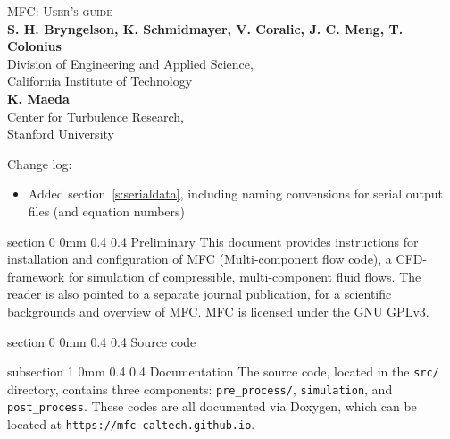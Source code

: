 \documentclass[11pt]{article}
\makeatletter
\renewcommand{\section}{\@startsection
{section}%
{0}%
{0mm}%
{0.4\baselineskip}%
{0.4\baselineskip}%
{\normalfont\Large\bfseries\color{myBrown}}}%
\renewcommand{\subsection}{\@startsection
{subsection}%
{1}%
{0mm}%
{0.4\baselineskip}%
{0.4\baselineskip}%
{\normalfont\large\bfseries\color{myBrown}}}%
\newcommand{\cPI}[1]{\textbf{\color{myBrown}#1}}
\makeatother
\begin{document}
\begin{center}
\vspace*{1.5in}

\textsc{\color{myBrown} \huge MFC: User's guide}\\
\bigskip
\bigskip
\cPI{S. H. Bryngelson, K. Schmidmayer, V. Coralic, J. C. Meng, T. Colonius}\\
\smallskip
{\color{myTan} Division of Engineering and Applied Science, \\ California Institute of Technology} \\
\medskip
\cPI{K. Maeda}\\
\smallskip
{\color{myTan} Center for Turbulence Research, \\ Stanford University} 
\end{center}

\bigskip\bigskip
Change log:
\begin{itemize}
    \item Added section~\ref{s:serialdata}, including naming convensions for serial output files (and equation numbers) 
\end{itemize}


\newpage
\setcounter{page}{1}
\pagestyle{plain}

\tableofcontents
\newpage

\sloppy
\section{Preliminary}
This document provides instructions for installation and configuration of MFC (Multi-component flow code), a CFD-framework for simulation of compressible, multi-component fluid flows.
The reader is also pointed to a separate journal publication, \citet{Bryngelson19} for a scientific backgrounds and overview of MFC. 
MFC is licensed under the GNU GPLv3.

\section{Source code}

\subsection{Documentation}
The source code, located in the \texttt{src/} directory, 
contains three components: \texttt{pre\_process/}, \texttt{simulation},
and \texttt{post\_process}. These codes are all documented
via Doxygen, which can be located at \texttt{https://mfc-caltech.github.io}. 
\end{document}
